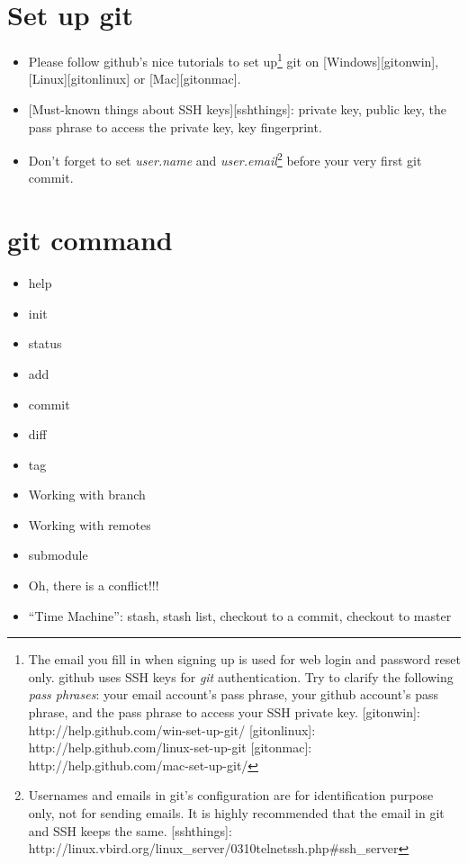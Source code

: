 \documentclass[]{article}
\begin{document}
\section{Set up git}

\begin{itemize}
\item
  Please follow github's nice tutorials to set up\footnote{The email you
    fill in when signing up is used for web login and password reset
    only. github uses SSH keys for \emph{git} authentication. Try to
    clarify the following \emph{pass phrases}: your email account's pass
    phrase, your github account's pass phrase, and the pass phrase to
    access your SSH private key. {[}gitonwin{]}:
    http://help.github.com/win-set-up-git/ {[}gitonlinux{]}:
    http://help.github.com/linux-set-up-git {[}gitonmac{]}:
    http://help.github.com/mac-set-up-git/} git on
  {[}Windows{]}{[}gitonwin{]}, {[}Linux{]}{[}gitonlinux{]} or
  {[}Mac{]}{[}gitonmac{]}.
\item
  {[}Must-known things about SSH keys{]}{[}sshthings{]}: private key,
  public key, the pass phrase to access the private key, key
  fingerprint.
\item
  Don't forget to set \emph{user.name} and \emph{user.email}\footnote{Usernames
    and emails in git's configuration are for identification purpose
    only, not for sending emails. It is highly recommended that the
    email in git and SSH keeps the same. {[}sshthings{]}:
    http://linux.vbird.org/linux\_server/0310telnetssh.php\#ssh\_server}
  before your very first git commit.
\end{itemize}
\section{git command}

\begin{itemize}
\item
  help
\item
  init
\item
  status
\item
  add
\item
  commit
\item
  diff
\item
  tag
\item
  Working with branch
\item
  Working with remotes
\item
  submodule
\item
  Oh, there is a conflict!!!
\item
  ``Time Machine'': stash, stash list, checkout to a commit, checkout to
  master
\end{itemize}
\end{document}
